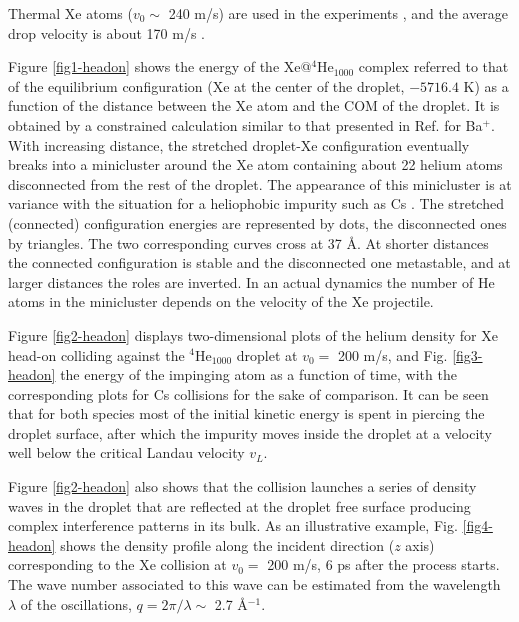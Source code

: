 		Thermal Xe atoms ($v_0 \sim$ 240 m/s) are used in the experiments \citep{Gom14,Jon16}, and the average drop velocity is about 170 m/s \citep{Gom11}.

		Figure \ref{fig1-headon} shows the energy of  the Xe@$^4$He$_{1000}$ complex  referred to that of the equilibrium configuration (Xe at the center of the droplet, $-5716.4$ K) as a function of the distance between the Xe  atom and  the COM of the droplet. It is obtained by a constrained calculation similar to that presented in Ref. \citep{Lea16} for Ba$^+$. 
With increasing distance, the stretched droplet-Xe configuration eventually breaks into a minicluster around the Xe atom containing 
about 22 helium atoms disconnected from the rest of the droplet.
The appearance of this minicluster is at variance with the situation for a heliophobic impurity such as Cs \citep{Lea14}.
The stretched (connected) configuration energies are represented by dots, the disconnected ones by triangles.
The two corresponding curves cross at  37 \AA{}.
At shorter distances the connected configuration is stable and the disconnected one metastable, and at larger distances the roles are inverted.
In an actual dynamics the number of He atoms in the minicluster  depends on the velocity of the Xe projectile.

 Figure \ref{fig2-headon} displays two-dimensional plots of the helium density for Xe  head-on  colliding against the $^4$He$_{1000}$
 droplet at $v_0=$ 200 m/s, and Fig. \ref{fig3-headon} the energy of the impinging atom as a function of time,
 with the corresponding plots for Cs collisions for the sake of comparison.  It can be seen that for both species
 most of the initial kinetic energy is spent in piercing the droplet surface, after which the impurity moves inside the droplet  
at a velocity  well below the critical Landau velocity  $v_L$. 
 
Figure \ref{fig2-headon} also shows that the collision launches a series of density waves in the droplet 
  that are reflected at the droplet free surface producing  complex interference patterns in
 its bulk. As an illustrative example, Fig. \ref{fig4-headon} shows the density profile along the incident direction ($z$ axis) corresponding to the Xe collision at $v_0=$
 200 m/s, 6 ps after the process starts.
 The wave number  associated to this  wave can be estimated from the wavelength $\lambda$  of the 
  oscillations, $q = 2 \pi/\lambda \sim$ 2.7 \AA$^{-1}$.

